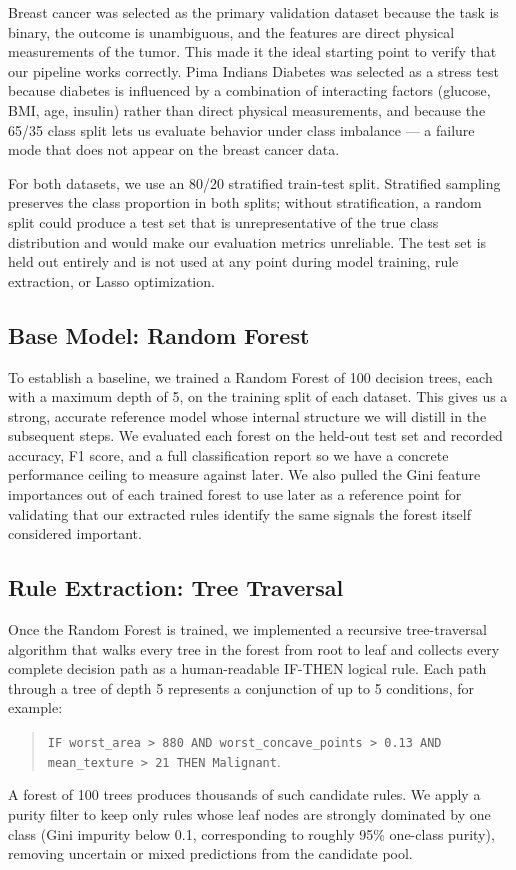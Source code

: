 \documentclass[11pt]{article}
\begin{document}
Breast cancer was selected as the primary validation dataset because the task is binary, the outcome is unambiguous, and the features are direct physical measurements of the tumor. This made it the ideal starting point to verify that our pipeline works correctly. Pima Indians Diabetes was selected as a stress test because diabetes is influenced by a combination of interacting factors (glucose, BMI, age, insulin) rather than direct physical measurements, and because the 65/35 class split lets us evaluate behavior under class imbalance --- a failure mode that does not appear on the breast cancer data.

For both datasets, we use an 80/20 stratified train-test split. Stratified sampling preserves the class proportion in both splits; without stratification, a random split could produce a test set that is unrepresentative of the true class distribution and would make our evaluation metrics unreliable. The test set is held out entirely and is not used at any point during model training, rule extraction, or Lasso optimization.

\subsection{Base Model: Random Forest}

To establish a baseline, we trained a Random Forest \citep{breiman2001randomforests} of 100 decision trees, each with a maximum depth of 5, on the training split of each dataset. This gives us a strong, accurate reference model whose internal structure we will distill in the subsequent steps. We evaluated each forest on the held-out test set and recorded accuracy, F1 score, and a full classification report so we have a concrete performance ceiling to measure against later. We also pulled the Gini feature importances out of each trained forest to use later as a reference point for validating that our extracted rules identify the same signals the forest itself considered important.

\subsection{Rule Extraction: Tree Traversal}

Once the Random Forest is trained, we implemented a recursive tree-traversal algorithm that walks every tree in the forest from root to leaf and collects every complete decision path as a human-readable IF-THEN logical rule. Each path through a tree of depth 5 represents a conjunction of up to 5 conditions, for example:
\begin{quote}
\small
\texttt{IF worst\_area > 880 AND worst\_concave\_points > 0.13 AND mean\_texture > 21 THEN Malignant}.
\end{quote}
A forest of 100 trees produces thousands of such candidate rules. We apply a purity filter to keep only rules whose leaf nodes are strongly dominated by one class (Gini impurity below 0.1, corresponding to roughly 95\% one-class purity), removing uncertain or mixed predictions from the candidate pool.
\end{document}
